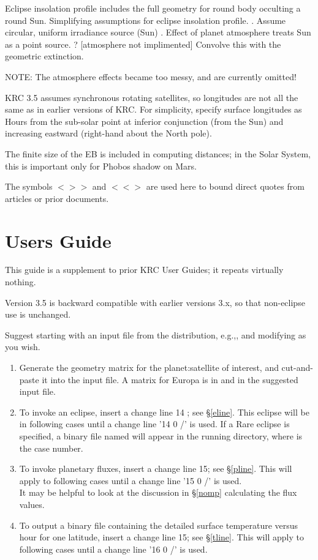 \documentclass{article}
\newcommand{\bq}{$ < \! > \!   \! >$ } %
\newcommand{\eq}{ $< \! \! < \! > $ } %
\begin{document}
Eclipse insolation profile includes the full geometry for round body occulting a round Sun. Simplifying assumptions for eclipse insolation profile.
. Assume circular, uniform irradiance source (Sun)
. Effect of planet atmosphere treats Sun as a point source. ? [atmosphere not implimented]
\qii  Convolve this with the geometric extinction.

NOTE: The atmosphere effects became too messy, and are currently omitted!

KRC 3.5 assumes synchronous rotating satellites, so longitudes are not all the
same as in earlier versions of KRC. For simplicity, specify surface longitudes
as Hours from the sub-solar point at inferior conjunction (from the Sun) and
increasing eastward (right-hand about the North pole).

The finite size of the EB is included in computing distances; in the Solar
System, this is important only for Phobos shadow on Mars.

The symbols \bq and \eq are used here to bound direct quotes from articles or
prior documents.
\section{Users Guide}

This guide is a supplement to prior KRC User Guides; it repeats virtually
nothing.

Version 3.5 is backward compatible with earlier versions 3.x, so that
non-eclipse use is unchanged.

Suggest starting with an input file from the distribution, e.g.,,
and modifying as you wish.

\begin{enumerate}    %
\item Generate the geometry matrix for the planet:satellite of interest, and
  cut-and-paste it into the input file. A matrix for Europa is in
   and in the suggested input file.

\item To invoke an eclipse, insert a change line 14 ; see \S \ref{eline}. This
  eclipse will be in following cases until a change line '14 0 /' is used.  If a
  Rare eclipse is specified, a binary file named  will appear
  in the running directory, where  is the case number.

\item To invoke planetary fluxes, insert a change line 15; see \S \ref{pline}.
  This will apply to following cases until a change line '15 0 /' is used.
  \\ It may be helpful to look at the discussion in \S \ref{nomp} calculating
  the flux values.

\item To output a binary file containing the detailed surface temperature versus
  hour for one latitude, insert a change line 15; see \S \ref{tline}. This will
  apply to following cases until a change line '16 0 /' is used.

\end{enumerate}
\end{document}

